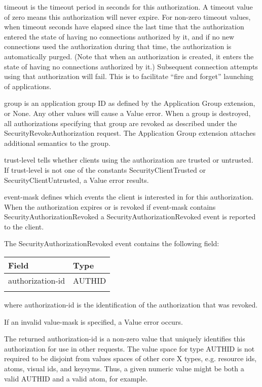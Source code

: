timeout is the timeout period in seconds for this authorization.  A
timeout value of zero means this authorization will never expire.  For
non-zero timeout values, when timeout seconds have elapsed since the
last time that the authorization entered the state of having no
connections authorized by it, and if no new connections used the
authorization during that time, the authorization is automatically
purged.  (Note that when an authorization is created, it enters the
state of having no connections authorized by it.)  Subsequent
connection attempts using that authorization will fail.  This is to
facilitate ``fire and forget'' launching of applications.

group is an application group ID as defined by the Application Group
extension, or None.  Any other values will cause a Value error.  When
a group is destroyed, all authorizations specifying that group are
revoked as described under the SecurityRevokeAuthorization request.
The Application Group extension attaches additional semantics to the
group.

trust-level tells whether clients using the authorization are trusted
or untrusted.  If trust-level is not one of the constants
SecurityClientTrusted or SecurityClientUntrusted, a Value error
results.

event-mask defines which events the client is interested in for
this authorization.  When the authorization expires or is revoked
if event-mask contains SecurityAuthorizationRevoked a
SecurityAuthorizationRevoked event is reported to the client.

The SecurityAuthorizationRevoked event contains the following field:

\begin{tabular}{ll}
\\ \hline
Field	& Type	\\ \hline
authorization-id	& AUTHID	\\ \hline
\\
\end{tabular}

where authorization-id is the identification of the authorization
that was revoked.

If an invalid value-mask is specified, a Value error occurs.

The returned authorization-id is a non-zero value that uniquely
identifies this authorization for use in other requests.  The value
space for type AUTHID is not required to be disjoint from values
spaces of other core X types, e.g. resource ids, atoms, visual ids,
and keysyms.  Thus, a given numeric value might be both a valid
AUTHID and a valid atom, for example.

